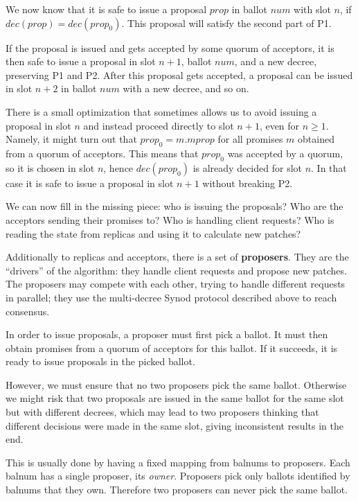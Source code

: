 \documentclass[12pt,a4paper,en]{pracamgr}
\newcommand{\tb}[1]{\textbf{#1}}
\newcommand{\ti}[1]{\textit{#1}}
\begin{document}
We now know that it is safe to issue a proposal $prop$ in ballot $num$ with slot $n$, if $dec(prop) = dec(prop_0)$. This proposal will satisfy the second part of P1.

If the proposal is issued and gets accepted by some quorum of acceptors, it is then safe to issue a proposal in slot $n+1$, ballot $num$, and a new decree, preserving P1 and P2. After this proposal gets accepted, a proposal can be issued in slot $n+2$ in ballot $num$ with a new decree, and so on.

There is a small optimization that sometimes allows us to avoid issuing a proposal in slot $n$ and instead proceed directly to slot $n+1$, even for $n \ge 1$. Namely, it might turn out that $prop_0 = m.mprop$ for all promises $m$ obtained from a quorum of acceptors. This means that $prop_0$ was accepted by a quorum, so it is chosen in slot $n$, hence $dec(prop_0)$ is already decided for slot $n$. In that case it is safe to issue a proposal in slot $n+1$ without breaking P2.

We can now fill in the missing piece: who is issuing the proposals? Who are the acceptors sending their promises to? Who is handling client requests? Who is reading the state from replicas and using it to calculate new patches?

Additionally to replicas and acceptors, there is a set of \tb{proposers}. They are the ``drivers'' of the algorithm: they handle client requests and propose new patches. The proposers may compete with each other, trying to handle different requests in parallel; they use the multi-decree Synod protocol described above to reach consensus.

In order to issue proposals, a proposer must first pick a ballot. It must then obtain promises from a quorum of acceptors for this ballot. If it succeeds, it is ready to issue proposals in the picked ballot.

However, we must ensure that no two proposers pick the same ballot. Otherwise we might risk that two proposals are issued in the same ballot for the same slot but with different decrees, which may lead to two proposers thinking that different decisions were made in the same slot, giving inconsistent results in the end.

This is usually done by having a fixed mapping from balnums to proposers. Each balnum has a single proposer, its \ti{owner}. Proposers pick only ballots identified by balnums that they own. Therefore two proposers can never pick the same ballot.
\end{document}
